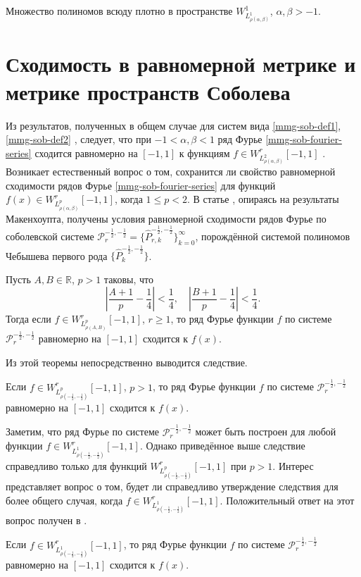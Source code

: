 \begin{lemma}\label{mmg-pol-dense}
	Множество полиномов всюду плотно в пространстве $W^1_{L^1_{\rho(\alpha,\beta)}}$, $\alpha, \beta > -1$.
\end{lemma}




\section{Сходимость в равномерной метрике и метрике пространств Соболева}
Из результатов, полученных в общем случае для систем вида \eqref{mmg-sob-def1}, \eqref{mmg-sob-def2} \cite[с. 38, теорема 2]{mmg-SharapudinovUMN}, следует, что при $-1 < \alpha, \beta < 1$ ряд Фурье \eqref{mmg-sob-fourier-series} сходится равномерно на $[-1,1]$ к функциям $f \in W^r_{L^2_{\rho(\alpha,\beta)}}[-1,1]$ \cite[с. 68, следствие 5]{mmg-SharapudinovUMN}.
Возникает естественный вопрос о том, сохранится ли свойство равномерной сходимости рядов Фурье \eqref{mmg-sob-fourier-series} для функций $f(x)\in W^r_{L^p_{\rho(\alpha,\beta)}}[-1,1]$, когда $1 \le p < 2$.
В статье \cite{mmg-Shii-izvran2018}, опираясь на результаты Макенхоупта, получены условия равномерной сходимости рядов Фурье по соболевской системе $\mathcal{P}^{-\frac12,-\frac12}_r=\{\hat{P}^{-\frac12,-\frac12}_{r,k}\}_{k=0}^\infty$, порождённой системой полиномов Чебышева первого рода $\{\hat{P}^{-\frac12,-\frac12}_{k}\}$.
\begin{theoremA}\label{mmg-st-sob-cheb-uniconv}
	Пусть $A, B \in \mathbb{R}$, $p>1$ таковы, что
	\begin{equation}\label{mmg-}
		\left|\frac{A+1}{p}-\frac{1}{4}\right|<\frac{1}{4},\quad
		\left|\frac{B+1}{p}-\frac{1}{4}\right|<\frac{1}{4}.
	\end{equation}
	Тогда если $f\in W^r_{L_{\rho(A,B)}^p}[-1,1]$, $r \ge 1$, то ряд Фурье функции $f$ по системе $\mathcal{P}^{-\frac12,-\frac12}_r$ равномерно на $[-1,1]$ сходится к $f(x)$.
\end{theoremA}
Из этой теоремы непосредственно выводится следствие.
\begin{corollaryA}
	Если $f \in W^r_{L_{\rho(-\frac{1}{2},-\frac{1}{2})}^p}[-1,1]$, $p>1$, то ряд Фурье функции $f$ по системе $\mathcal{P}^{-\frac12,-\frac12}_r$ равномерно на $[-1,1]$ сходится к $f(x)$.
\end{corollaryA}
Заметим, что ряд Фурье по системе $\mathcal{P}^{-\frac12,-\frac12}_r$ может быть построен для любой функции $f \in W^r_{L_{\rho(-\frac{1}{2},-\frac{1}{2})}^1}[-1,1]$. Однако приведённое выше следствие справедливо только для функций $W^r_{L_{\rho(-\frac{1}{2},-\frac{1}{2})}^p}[-1,1]$ при $p>1$. Интерес представляет вопрос о том, будет ли справедливо утверждение следствия для более общего случая, когда $f \in W^r_{L_{\rho(-\frac{1}{2},-\frac{1}{2})}^1}[-1,1]$. Положительный ответ на этот вопрос получен в \cite[теорема 6]{mmg-Shii-izvran2018}.
\begin{theoremA}
	Если $f \in W^r_{L_{\rho(-\frac{1}{2},-\frac{1}{2})}^1}[-1,1]$, то ряд Фурье функции $f$ по системе $\mathcal{P}^{-\frac12,-\frac12}_r$ равномерно на $[-1,1]$ сходится к $f(x)$.
\end{theoremA}

